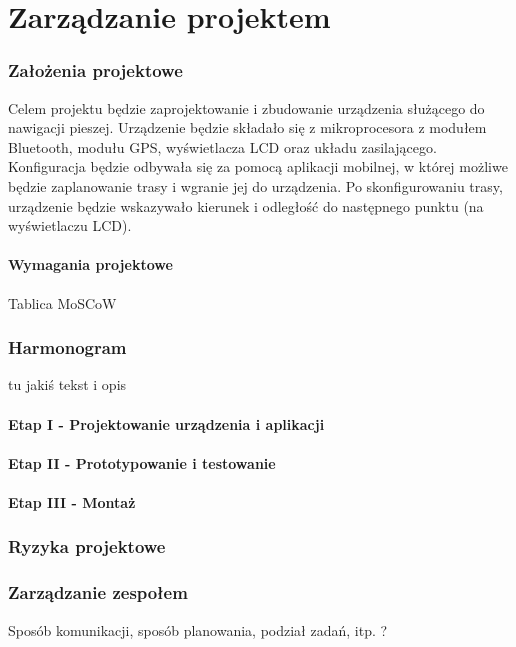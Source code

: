 \part{Zarządzanie projektem}

\section{Założenia projektowe}
Celem projektu będzie zaprojektowanie i zbudowanie urządzenia służącego do nawigacji pieszej. Urządzenie będzie składało się z mikroprocesora z modułem Bluetooth, modułu GPS, wyświetlacza LCD oraz układu zasilającego. Konfiguracja będzie odbywała się za pomocą aplikacji mobilnej, w której możliwe będzie zaplanowanie trasy i wgranie jej do urządzenia.
Po skonfigurowaniu trasy, urządzenie będzie wskazywało kierunek i odległość do następnego punktu (na wyświetlaczu LCD).

\subsection{Wymagania projektowe}
Tablica MoSCoW

\section{Harmonogram}
tu jakiś tekst i opis

\subsection{Etap I - Projektowanie urządzenia i aplikacji}

\subsection{Etap II - Prototypowanie i testowanie}

\subsection{Etap III - Montaż}

\section{Ryzyka projektowe}

\section{Zarządzanie zespołem}
Sposób komunikacji, sposób planowania, podział zadań, itp. ?